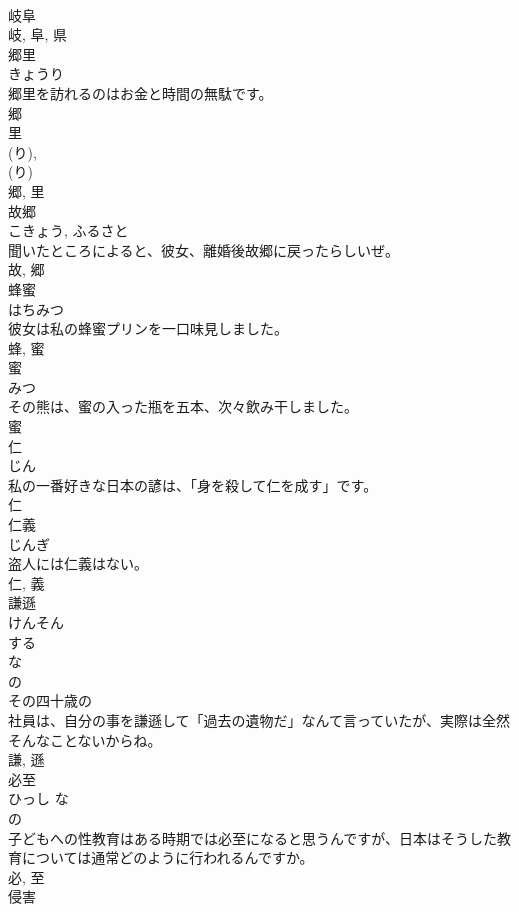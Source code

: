 \documentclass[8pt]{extreport}
\begin{document}
\begin{CJK}{UTF8}{min}
\\	岐阜 
\\	岐, 阜, 県	
\\	郷里	
\\	きょうり	
\\	郷里を訪れるのはお金と時間の無駄です。	
\\	郷 
\\	里 
\\	(り), 
\\	(り) 
\\	郷, 里	
\\	故郷	
\\	こきょう, ふるさと	
\\	聞いたところによると、彼女、離婚後故郷に戻ったらしいぜ。	
\\	故, 郷	
\\	蜂蜜	
\\	はちみつ	
\\	彼女は私の蜂蜜プリンを一口味見しました。	
\\	蜂, 蜜	
\\	蜜	
\\	みつ	
\\	その熊は、蜜の入った瓶を五本、次々飲み干しました。	
\\	蜜	
\\	仁	
\\	じん	
\\	私の一番好きな日本の諺は、「身を殺して仁を成す」です。	
\\	仁	
\\	仁義	
\\	じんぎ	
\\	盗人には仁義はない。	
\\	仁, 義	
\\	謙遜	
\\	けんそん	
\\	する 
\\	な 
\\	の 
\\	その四十歳の
\\	社員は、自分の事を謙遜して「過去の遺物だ」なんて言っていたが、実際は全然そんなことないからね。	
\\	謙, 遜	
\\	必至	
\\	ひっし	な 
\\	の 
\\	子どもへの性教育はある時期では必至になると思うんですが、日本はそうした教育については通常どのように行われるんですか。	
\\	必, 至	
\\	侵害	

\end{CJK}
\end{document}
